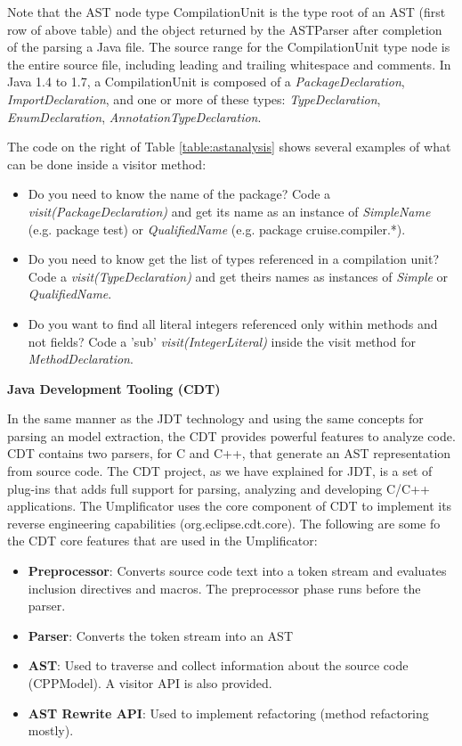 Note that the AST node type CompilationUnit is the type root of an AST (first row of above table) and the object returned by the ASTParser after completion of the parsing a Java file. The source range for the CompilationUnit type node is the entire source file, including leading and trailing whitespace and comments. In Java 1.4 to 1.7, a CompilationUnit is composed of 
a \textit{PackageDeclaration}, \textit{ImportDeclaration}, and one or more of these types:  \textit{TypeDeclaration}, \textit{EnumDeclaration}, \textit{AnnotationTypeDeclaration}. 

The code on the right of Table \ref{table:astanalysis} shows several examples of what can be done inside a visitor method:

\begin{itemize}
\item Do you need to know the name of the package? Code a \textit{visit(PackageDeclaration)} and get its name as an instance of \textit{SimpleName} (e.g. package test)  or \textit{QualifiedName} (e.g. package cruise.compiler.*).
\item Do you need to know get the list of types referenced in a compilation unit? Code a \textit{visit(TypeDeclaration)} and get theirs names as instances of \textit{Simple} or \textit{QualifiedName}.
\item Do you want to find all literal integers referenced only within methods and not fields? Code a 'sub' \textit{visit(IntegerLiteral)} inside the visit method for \textit{MethodDeclaration}.
\end{itemize}

\textbf{Java Development Tooling (CDT)}

In the same manner as the JDT technology and using the same concepts for parsing an model extraction, the CDT provides powerful features to analyze code. CDT contains two parsers, for C and C++, that generate an AST representation from source code. The CDT project, as we have explained for JDT, is a set of plug-ins that adds full support for parsing, analyzing and developing C/C++ applications. The Umplificator uses the core component of CDT to implement its reverse engineering capabilities (org.eclipse.cdt.core). The following are some fo the CDT core features that are used in the Umplificator:


\begin{itemize}
\item \textbf{Preprocessor}: Converts source code text into a token stream and evaluates inclusion directives and macros. The preprocessor phase runs before the parser. 
\item \textbf{Parser}: Converts the token stream into an AST
\item \textbf{AST}: Used to traverse and collect information about the source code (CPPModel). A visitor API is also provided. 
\item \textbf{AST Rewrite API}: Used to implement refactoring (method refactoring mostly).
\end{itemize}

